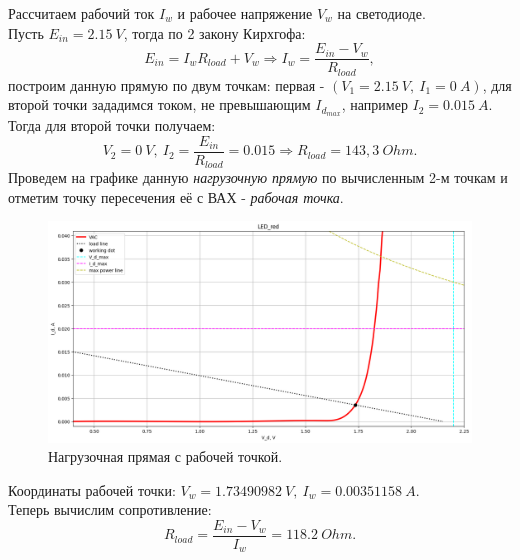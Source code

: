 \documentclass[12pt]{article}
\begin{document}
Рассчитаем рабочий ток $I_w$ и рабочее напряжение $V_w$ на светодиоде. \\
Пусть $E_{in} = 2.15 \ V$, тогда по 2 закону Кирхгофа:
\[
    E_{in} = I_w R_{load} + V_w \Rightarrow I_w = \frac{E_{in} - V_w}{R_{load}},
\]
построим данную прямую по двум точкам: первая - $(V_1 = 2.15 \ V, \ I_1 = 0 \ A)$, для второй точки зададимся током, не превышающим $I_{d_{max}}$, например $I_2 = 0.015 \ A$. Тогда для второй точки получаем:
\[
    V_2 = 0 \ V, \ I_2 = \frac{E_{in}}{R_{load}} = 0.015 \Rightarrow R_{load} = 143,3 \ Ohm.
\]
Проведем на графике данную \emph{нагрузочную прямую} по вычисленным 2-м точкам и отметим точку пересечения её с ВАХ - \emph{рабочая точка}. \\
\begin{figure}[H]
    \centering
    \includegraphics[width=\textwidth]{work_area_custom_w_ll_and_wd.png}
    \caption{Нагрузочная прямая с рабочей точкой.}
    \label{fig:work_area_custom_w_ll_and_wd}
\end{figure}
Координаты рабочей точки: $V_w = 1.73490982 \ V, \ I_w = 0.00351158 \ A$.\\
Теперь вычислим сопротивление:
\[
    R_{load} = \frac{E_{in} - V_w}{I_w} = 118.2 \ Ohm.
\]
\end{document}
